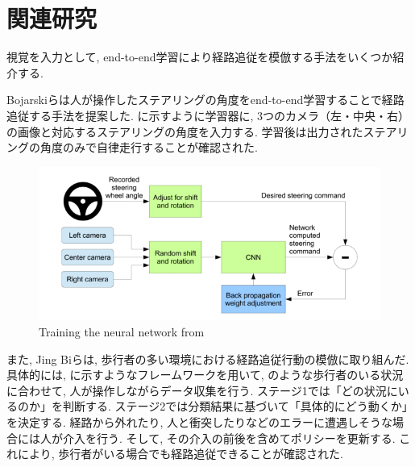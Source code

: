\section{関連研究}
視覚を入力として, end-to-end学習により経路追従を模倣する手法をいくつか紹介する. \par Bojarskiらは人が操作したステアリングの角度をend-to-end学習することで経路追従する手法を提案した. に示すように学習器に, 3つのカメラ（左・中央・右）の画像と対応するステアリングの角度を入力する. 学習後は出力されたステアリングの角度のみで自律走行することが確認された\cite{bojaski}. 

\begin{figure}[h]
     \centering
     \includegraphics[keepaspectratio, scale=0.45]
     {images/bojaski.png}
     \caption{Training the neural network from \cite{bojaski}}
     \label{Fig:bojaski}
     \end{figure}

また, Jing Biらは, 歩行者の多い環境における経路追従行動の模倣に取り組んだ. 具体的には, に示すようなフレームワークを用いて, のような歩行者のいる状況に合わせて, 人が操作しながらデータ収集を行う. ステージ1では「どの状況にいるのか」を判断する. ステージ2では分類結果に基づいて「具体的にどう動くか」を決定する. 経路から外れたり, 人と衝突したりなどのエラーに遭遇しそうな場合には人が介入を行う. そして, その介入の前後を含めてポリシーを更新する. これにより, 歩行者がいる場合でも経路追従できることが確認された. 

